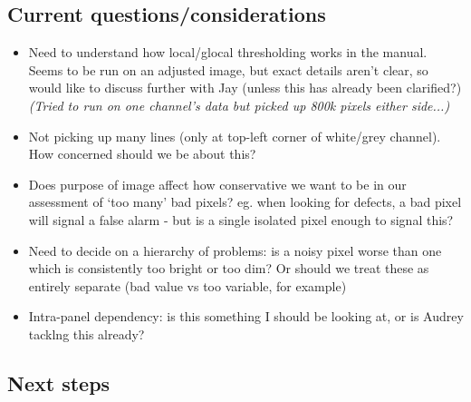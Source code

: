 \documentclass[10pt,fleqn]{article}
\begin{document}
\subsection*{Current questions/considerations}
\begin{itemize}

\item
Need to understand how local/glocal thresholding works in the manual. Seems to be run on an adjusted image, but exact details aren't clear, so would like to discuss further with Jay (unless this has already been clarified?) \textit{(Tried to run on one channel's data but picked up 800k pixels either side...)}

\item
Not picking up many lines (only at top-left corner of white/grey channel). How concerned should we be about this?

\item Does purpose of image affect how conservative we want to be in our assessment of `too many' bad pixels? eg. when looking for defects, a bad pixel will signal a false alarm - but is a single isolated pixel enough to signal this? %

\item Need to decide on a hierarchy of problems: is a noisy pixel worse than one which is consistently too bright or too dim? Or should we treat these as entirely separate (bad value vs too variable, for example)

\item Intra-panel dependency: is this something I should be looking at, or is Audrey tacklng this already?
\end{itemize}




\subsection*{Next steps}
\end{document}
